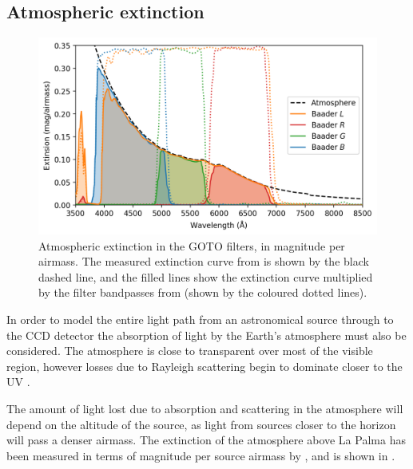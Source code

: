 \begin{colsection}
\begin{colsection}
\end{colsection}

\newpage
\subsection{Atmospheric extinction}
\label{sec:atmosphere}
\begin{colsection}

\begin{figure}[t]
    \begin{center}
        \includegraphics[width=\textwidth]{images/throughput/ext.png}
    \end{center}
    \caption[Atmospheric extinction in the GOTO filters]{
        Atmospheric extinction in the GOTO filters, in magnitude per airmass. The measured extinction curve from \citet{tn31} is shown by the black dashed line, and the filled lines show the extinction curve multiplied by the filter bandpasses from  (shown by the coloured dotted lines).
    }\label{fig:extinction}
\end{figure}

In order to model the entire light path from an astronomical source through to the CCD detector the absorption of light by the Earth's atmosphere must also be considered. The atmosphere is close to transparent over most of the visible region, however losses due to Rayleigh scattering begin to dominate closer to the UV \citep{atmosphere}.

The amount of light lost due to absorption and scattering in the atmosphere will depend on the altitude of the source, as light from sources closer to the horizon will pass a denser airmass. The extinction of the atmosphere above La Palma has been measured in terms of magnitude per source airmass by \citet{tn31}, and is shown in .


\end{colsection}
\end{colsection}
